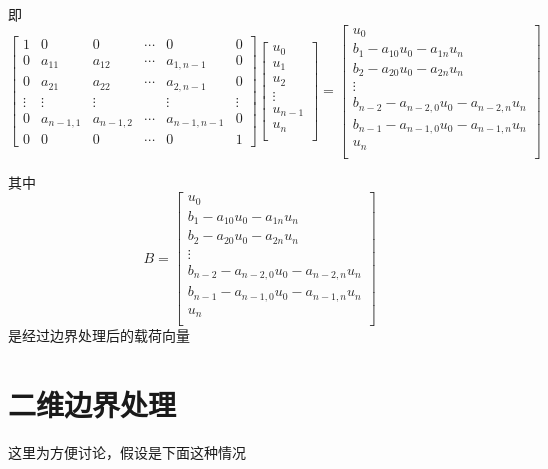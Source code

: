 \documentclass[12pt,a4paper]{article}
\begin{document}
即
$$
\begin{bmatrix}
1 & 0 & 0 & \cdots & 0 & 0 \\
0 & a_{11} & a_{12} & \cdots & a_{1,n-1} & 0 \\
0 & a_{21} & a_{22} & \cdots & a_{2,n-1} & 0 \\
\vdots & \vdots & \vdots &  & \vdots  & \vdots \\
0 & a_{n-1,1} & a_{n-1,2} & \cdots & a_{n-1,n-1} & 0 \\
0 & 0 & 0 & \cdots & 0 & 1
\end{bmatrix}
\begin{bmatrix}
u_{0} \\
u_{1} \\
u_{2} \\
\vdots \\
u_{n-1} \\
u_{n} \\
\end{bmatrix}=
\begin{bmatrix}
u_{0} \\
b_1-a_{10}u_0-a_{1n}u_n \\
b_2-a_{20}u_0-a_{2n}u_n \\
\vdots \\
b_{n-2}-a_{n-2,0}u_0-a_{n-2,n}u_n  \\
b_{n-1}-a_{n-1,0}u_0-a_{n-1,n}u_n \\
u_{n} \\
\end{bmatrix}
$$

其中
$$B=\begin{bmatrix}
u_{0} \\
b_1-a_{10}u_0-a_{1n}u_n \\
b_2-a_{20}u_0-a_{2n}u_n \\
\vdots \\
b_{n-2}-a_{n-2,0}u_0-a_{n-2,n}u_n  \\
b_{n-1}-a_{n-1,0}u_0-a_{n-1,n}u_n \\
u_{n} \\
\end{bmatrix}
$$
是经过边界处理后的载荷向量

\section{二维边界处理}

这里为方便讨论，假设是下面这种情况
\end{document}
